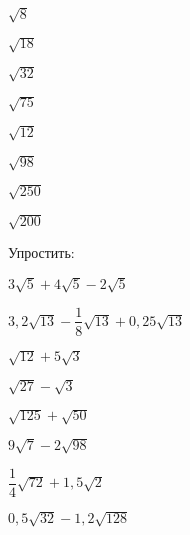 \begin{class}[number=3]
\begin{listofex}
		\begin{enumcols}[itemcolumns=8]
			\item \( \sqrt{8} \)
			\item \( \sqrt{18} \)
			\item \( \sqrt{32} \)
			\item \( \sqrt{75} \)
			\item \( \sqrt{12} \)
			\item \( \sqrt{98} \)
			\item \( \sqrt{250} \)
			\item \( \sqrt{200} \)
		\end{enumcols}
		\item Упростить:
		\begin{enumcols}[itemcolumns=2]
			\item \( 3\sqrt{5}+4\sqrt{5}-2\sqrt{5} \)
			\item \( 3,2\sqrt{13}-\dfrac{1}{8}\sqrt{13}+0,25\sqrt{13} \)
			\item \( \sqrt{12}+5\sqrt{3} \)
			\item \( \sqrt{27}-\sqrt{3} \)
			\item \( \sqrt{125}+\sqrt{50} \)
			\item \( 9\sqrt{7}-2\sqrt{98} \)
			\item \( \dfrac{1}{4}\sqrt{72}+1,5\sqrt{2} \)
			\item \( 0,5\sqrt{32}-1,2\sqrt{128} \)
			

\end{enumcols}
\end{listofex}
\end{class}
